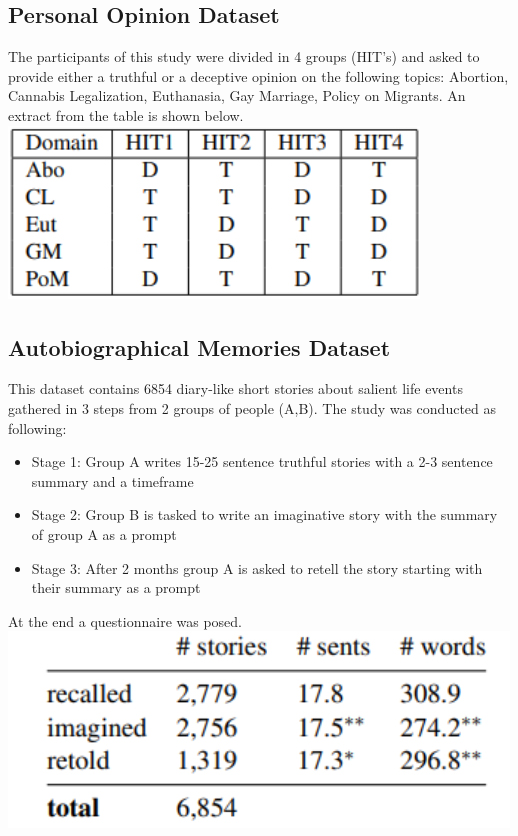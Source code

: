 \documentclass[10pt,twocolumn,letterpaper]{article}
\begin{document}
\subsection{Personal Opinion Dataset}

The participants of this study were divided in 4 groups (HIT’s) and asked to provide either 
a truthful or a deceptive opinion on the following topics: Abortion, Cannabis Legalization, Euthanasia, Gay Marriage, Policy on Migrants.
An extract from the table is shown below. \\

\includegraphics[scale=0.4]{img/pers_op_dataset.jpg}

\subsection{Autobiographical Memories Dataset}

This dataset contains 6854 diary-like short stories about salient life events gathered in 3 steps from 2 groups of people (A,B).
The study was conducted as following:

\begin{itemize}
    \item Stage 1: Group A writes 15-25 sentence truthful stories with a 2-3 sentence summary and a timeframe
    \item Stage 2: Group B is tasked to write an imaginative story with the summary of group A as a prompt
    \item Stage 3: After 2 months group A is asked to retell the story starting with their summary as a prompt
\end{itemize}
At the end a questionnaire was posed. \\

\includegraphics[scale=0.35]{img/autobio_mem_dataset.jpg}
\end{document}
